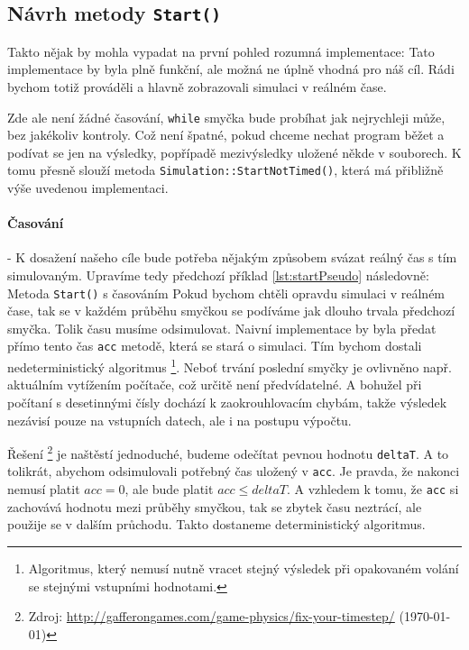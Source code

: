 \subsection{Návrh metody \texttt{Start()}}
\label{sec:startMetoda}
Takto nějak by mohla vypadat na první pohled rozumná implementace:
Tato implementace by byla plně funkční, ale možná ne úplně vhodná pro náš cíl. Rádi bychom totiž prováděli a hlavně zobrazovali simulaci v reálném čase. 

Zde ale není žádné časování, \texttt{while} smyčka bude probíhat jak nejrychleji může, bez jakékoliv kontroly. Což není špatné, pokud chceme nechat program běžet a podívat se jen na výsledky, popřípadě mezivýsledky uložené někde v souborech. K tomu přesně slouží metoda \texttt{Simulation::StartNotTimed()}, která má přibližně výše uvedenou implementaci. 
\paragraph{Časování}
- K dosažení našeho cíle bude potřeba nějakým způsobem svázat reálný čas s tím simulovaným. Upravíme tedy předchozí příklad \ref{lst:startPseudo} následovně:
{Metoda \texttt{Start()} s časováním}
Pokud bychom chtěli opravdu simulaci v reálném čase, tak se v každém průběhu smyčkou se podíváme jak dlouho trvala předchozí smyčka. Tolik času musíme odsimulovat. Naivní implementace by byla předat přímo tento čas \texttt{acc} metodě, která se stará o simulaci. Tím bychom dostali nedeterministický algoritmus
\footnote{Algoritmus, který nemusí nutně vracet stejný výsledek při opakovaném volání se stejnými vstupními hodnotami.}.
Neboť trvání poslední smyčky je ovlivněno např. aktuálním vytížením počítače, což určitě není předvídatelné. A bohužel při počítaní s desetinnými čísly dochází k zaokrouhlovacím chybám, takže výsledek nezávisí pouze na vstupních datech, ale i na postupu výpočtu.

Řešení \footnote{Zdroj: \url{http://gafferongames.com/game-physics/fix-your-timestep/} (\today)}
je naštěstí jednoduché, budeme odečítat pevnou hodnotu \texttt{deltaT}.
A to tolikrát, abychom odsimulovali potřebný čas uložený v \texttt{acc}. Je pravda,
že nakonci nemusí platit $ acc=0 $, ale bude platit $ acc\leq deltaT $. A vzhledem k tomu, že \texttt{acc} si zachovává hodnotu mezi průběhy smyčkou, tak se zbytek času neztrácí, ale použije se v dalším průchodu. Takto dostaneme deterministický algoritmus.

